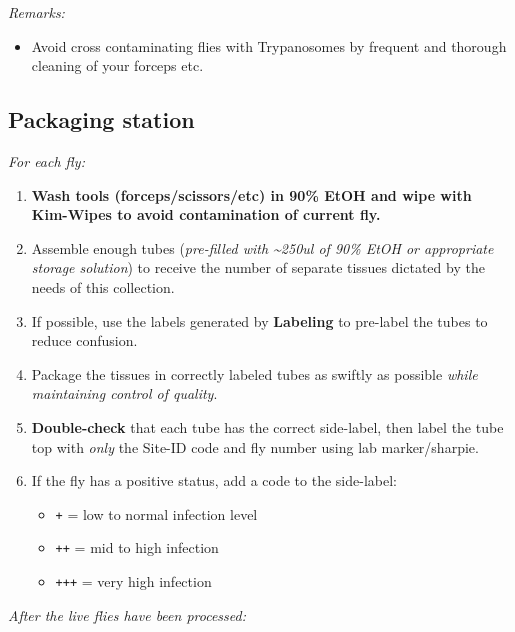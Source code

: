 \documentclass[letterpaper]{scrreprt}
\begin{document}
\emph{Remarks:}

\begin{itemize}
\itemsep1pt\parskip0pt
\item
  Avoid cross contaminating flies with Trypanosomes by frequent and
  thorough cleaning of your forceps etc.
\end{itemize}

\subsection{Packaging station}\label{packaging-station}

\emph{For each fly:}

\begin{enumerate}
\def\labelenumi{\arabic{enumi}.}
\itemsep1pt\parskip0pt
\item
  \textbf{Wash tools (forceps/scissors/etc) in 90\% EtOH and wipe with
  Kim-Wipes to avoid contamination of current fly.}
\item
  Assemble enough tubes (\emph{pre-filled with \textasciitilde{}250ul of
  90\% EtOH or appropriate storage solution}) to receive the number of
  separate tissues dictated by the needs of this collection.
\item
  If possible, use the labels generated by \textbf{Labeling} to
  pre-label the tubes to reduce confusion.
\item
  Package the tissues in correctly labeled tubes as swiftly as possible
  \emph{while maintaining control of quality}.
\item
  \textbf{Double-check} that each tube has the correct side-label, then
  label the tube top with \emph{only} the Site-ID code and fly number
  using lab marker/sharpie.
\item
  If the fly has a positive status, add a code to the side-label:

  \begin{itemize}
  \itemsep1pt\parskip0pt
  \item
    \texttt{\textquotesingle{}+\textquotesingle{}} = low to normal
    infection level
  \item
    \texttt{\textquotesingle{}++\textquotesingle{}} = mid to high
    infection
  \item
    \texttt{\textquotesingle{}+++\textquotesingle{}} = very high
    infection
  \end{itemize}
\end{enumerate}

\emph{After the live flies have been processed:}
\end{document}
